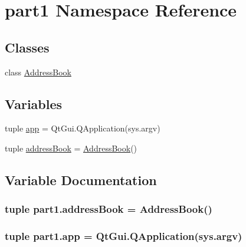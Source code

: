 \hypertarget{namespacepart1}{}\section{part1 Namespace Reference}
\label{namespacepart1}
\subsection*{Classes}
\begin{DoxyCompactItemize}
\item 
class \hyperlink{classpart1_1_1AddressBook}{Address\+Book}
\end{DoxyCompactItemize}
\subsection*{Variables}
\begin{DoxyCompactItemize}
\item 
tuple \hyperlink{namespacepart1_adb78dbc67624bd65d7a9ef6682d84674}{app} = Qt\+Gui.\+Q\+Application(sys.\+argv)
\item 
tuple \hyperlink{namespacepart1_ae23cbb7c6f7a80578c80023be31a1377}{address\+Book} = \hyperlink{classpart1_1_1AddressBook}{Address\+Book}()
\end{DoxyCompactItemize}


\subsection{Variable Documentation}
\hypertarget{namespacepart1_ae23cbb7c6f7a80578c80023be31a1377}{}
\subsubsection[{address\+Book}]{\setlength{\rightskip}{0pt plus 5cm}tuple part1.\+address\+Book = {\bf Address\+Book}()}\label{namespacepart1_ae23cbb7c6f7a80578c80023be31a1377}
\hypertarget{namespacepart1_adb78dbc67624bd65d7a9ef6682d84674}{}
\subsubsection[{app}]{\setlength{\rightskip}{0pt plus 5cm}tuple part1.\+app = Qt\+Gui.\+Q\+Application(sys.\+argv)}\label{namespacepart1_adb78dbc67624bd65d7a9ef6682d84674}
